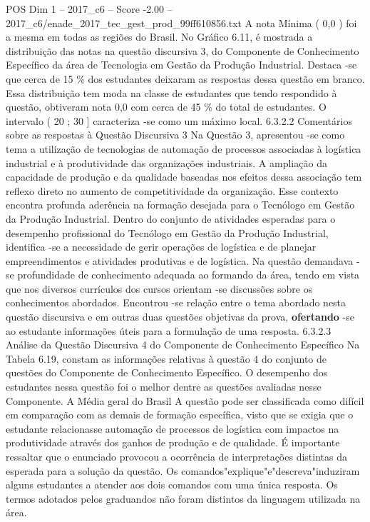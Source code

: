\begin{textsample}{POS Dim 1 – 2017\_c6 – Score -2.00 – 2017\_c6/enade\_2017\_tec\_gest\_prod\_99ff610856.txt}
A nota Mínima ( 0,0 ) foi a mesma em todas as regiões do Brasil.
No Gráfico 6.11, é mostrada a distribuição das notas na questão discursiva 3, do Componente de Conhecimento Específico da área de Tecnologia em Gestão da Produção Industrial.
Destaca -se que cerca de 15 \% dos estudantes deixaram as respostas dessa questão em branco.
Essa distribuição tem moda na classe de estudantes que tendo respondido à questão, obtiveram nota 0,0 com cerca de 45 \% do total de estudantes.
O intervalo ( 20 ; 30 ] caracteriza -se como um máximo local. 6.3.2.2 Comentários sobre as respostas à Questão Discursiva 3 Na Questão 3, apresentou -se como tema a utilização de tecnologias de automação de processos associadas à logística industrial e à produtividade das organizações industriais.
A ampliação da capacidade de produção e da qualidade baseadas nos efeitos dessa associação tem reflexo direto no aumento de competitividade da organização.
Esse contexto encontra profunda aderência na formação desejada para o Tecnólogo em Gestão da Produção Industrial.
Dentro do conjunto de atividades esperadas para o desempenho profissional do Tecnólogo em Gestão da Produção Industrial, identifica -se a necessidade de gerir operações de logística e de planejar empreendimentos e atividades produtivas e de logística.
Na questão demandava -se profundidade de conhecimento adequada ao formando da área, tendo em vista que nos diversos currículos dos cursos orientam -se discussões sobre os conhecimentos abordados.
Encontrou -se relação entre o tema abordado nesta questão discursiva e em outras duas questões objetivas da prova, \textbf{ofertando} -se ao estudante informações úteis para a formulação de uma resposta. 6.3.2.3 Análise da Questão Discursiva 4 do Componente de Conhecimento Específico Na Tabela 6.19, constam as informações relativas à questão 4 do conjunto de questões do Componente de Conhecimento Específico.
O desempenho dos estudantes nessa questão foi o melhor dentre as questões avaliadas nesse Componente.
A Média geral do Brasil A questão pode ser classificada como difícil em comparação com as demais de formação específica, visto que se exigia que o estudante relacionasse automação de processos de logística com impactos na produtividade através dos ganhos de produção e de qualidade.
É importante ressaltar que o enunciado provocou a ocorrência de interpretações distintas da esperada para a solução da questão.
Os comandos"explique"e"descreva"induziram alguns estudantes a atender aos dois comandos com uma única resposta.
Os termos adotados pelos graduandos não foram distintos da linguagem utilizada na área.

\end{textsample}
